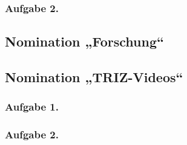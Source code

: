 \documentclass[11pt,a4paper]{article}
\begin{document}
\subsubsection*{Aufgabe 2.}\CosmicInventions

\subsection{Nomination „Forschung“}

\BlackBoxOfCivilization

\subsection{Nomination „TRIZ-Videos“}

\subsubsection*{Aufgabe 1.}\VideoOne
\subsubsection*{Aufgabe 2.}\VideoThree

\GeneralText
\end{document}
